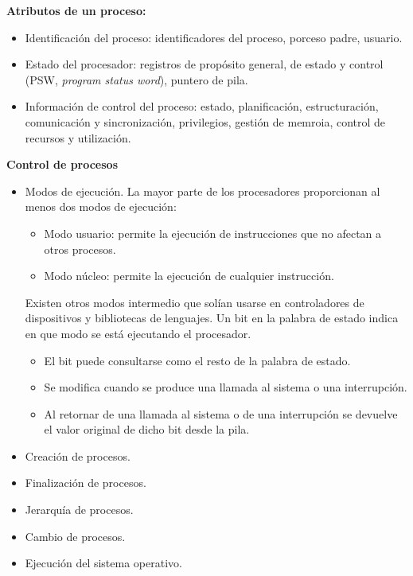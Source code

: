 \documentclass{article}
\begin{document}
\textbf{Atributos de un proceso:}
\begin{itemize}
\item Identificación del proceso: identificadores del proceso, porceso padre, usuario.

\item Estado del procesador: registros de propósito general, de estado y control (PSW, \textit{program status word}), puntero de pila.

\item Información de control del proceso: estado, planificación, estructuración, comunicación y sincronización, privilegios, gestión de memroia, control de recursos y utilización.
\end{itemize}

\textbf{Control de procesos}
\begin{itemize}
\item Modos de ejecución. La mayor parte de los procesadores proporcionan al menos dos modos de ejecución:
	\begin{itemize}
	\item Modo usuario: permite la ejecución de instrucciones que no afectan a otros procesos.
	
	\item Modo núcleo: permite la ejecución de cualquier instrucción.
	\end{itemize}

Existen otros modos intermedio que solían usarse en controladores de dispositivos y bibliotecas de lenguajes. Un bit en la palabra de estado indica en que modo se está ejecutando el procesador.
	\begin{itemize}
	\item El bit puede consultarse como el resto de la palabra de estado.
	
	\item Se modifica cuando se produce una llamada al sistema o una interrupción.	
	
	\item Al retornar de una llamada al sistema o de una interrupción se devuelve el valor original de dicho bit desde la pila.
	\end{itemize}

\item Creación de procesos.

\item Finalización de procesos.

\item Jerarquía de procesos.

\item Cambio de procesos.

\item Ejecución del sistema operativo.
\end{itemize}
\end{document}
